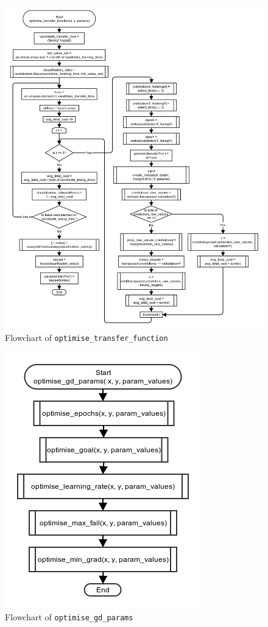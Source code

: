 \documentclass[10pt,a4paper]{article}
\begin{document}
\begin{figure}[!ht]
	\centering
	\includegraphics[height=\textheight, width=\textwidth]{images/flow_chart/optimise_transfer_function.png}
	\caption{Flowchart of \tt{optimise\_transfer\_function}}
	\label{fig:optimise_transfer_function}
\end{figure}

\begin{figure}[!ht]
	\centering
	\includegraphics[scale=0.7]{images/flow_chart/optimise_gd_params.png}
	\caption{Flowchart of \tt{optimise\_gd\_params}}
	\label{fig:optimise_gd_params}
\end{figure}
\end{document}
